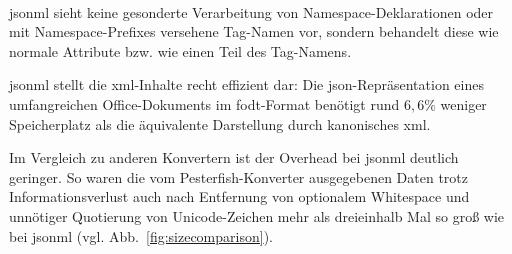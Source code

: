 \begin{figure}[h]
    \begin{example}~
    \inputminted{json}{xmltree.json}
    \label{fig:xmltreejsonml}
    \end{example}
\end{figure}

\acrshort{jsonml} sieht keine gesonderte Verarbeitung von Namespace-Deklarationen oder mit Namespace-Prefixes versehene Tag-Namen vor, sondern behandelt diese wie normale Attribute bzw. wie einen Teil des Tag-Namens.

\acrshort{jsonml} stellt die \acrshort{xml}-Inhalte recht effizient dar: Die \acrshort{json}-Repräsentation eines umfangreichen Office-Dokuments im \acrshort{fodt}-Format benötigt rund $6{,}6\%$ weniger Speicherplatz als die äquivalente Darstellung durch kanonisches \acrshort{xml}.

Im Vergleich zu anderen Konvertern ist der Overhead bei \acrshort{jsonml} deutlich geringer. So waren die vom Pesterfish-Konverter ausgegebenen Daten trotz Informationsverlust auch nach Entfernung von optionalem Whitespace und unnötiger Quotierung von Unicode-Zeichen mehr als dreieinhalb Mal so groß wie bei \acrshort{jsonml} (vgl. Abb.~\ref{fig:sizecomparison}).

